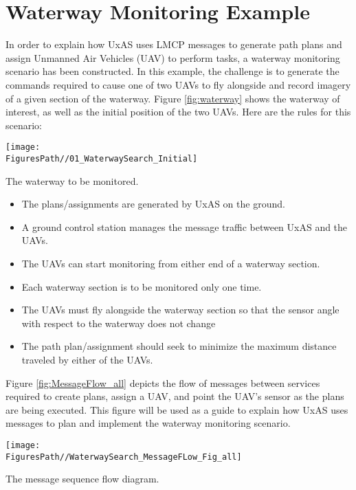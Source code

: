 
\section{Waterway Monitoring Example}
In order to explain how UxAS uses LMCP messages to generate path plans and assign Unmanned Air Vehicles (UAV) to perform tasks, a waterway monitoring scenario has been constructed. In this example, the challenge is to generate the commands required to cause one of two UAVs to fly alongside and record imagery of a given section of the waterway. Figure \ref{fig:waterway} shows the waterway of interest, as well as the initial position of the two UAVs. Here are the rules for this scenario:
\graphicspath{{./figures/}}
\begin{marginfigure}
	\texttt{[image: \\FiguresPath//01\_WaterwaySearch\_Initial]}
	\caption{The waterway to be monitored.}
	\label{fig:waterway}
\end{marginfigure}

\begin{itemize}
	\item The plans/assignments are generated by UxAS on the ground. 
	\item A ground control station manages the message traffic between UxAS and the UAVs.
	\item The UAVs can start monitoring from either end of a waterway section.
	\item Each waterway section is to be monitored only one time.
	\item The UAVs must fly alongside the waterway section so that the sensor angle with respect to the waterway does not change
	\item The path plan/assignment should seek to minimize the maximum distance traveled by either of the UAVs.
\end{itemize}

\noindent Figure \ref{fig:MessageFlow_all} depicts the flow of messages between services required to create plans, assign a UAV, and point the UAV's sensor as the plans are being executed. This figure will be used as a guide to explain how UxAS uses messages to plan and implement the waterway monitoring scenario. 
\begin{marginfigure}[30pt]
	\texttt{[image: \\FiguresPath//WaterwaySearch\_MessageFLow\_Fig\_all]}
	\caption{The message sequence flow diagram.}
	\label{fig:MessageFlow_all}
\end{marginfigure}

